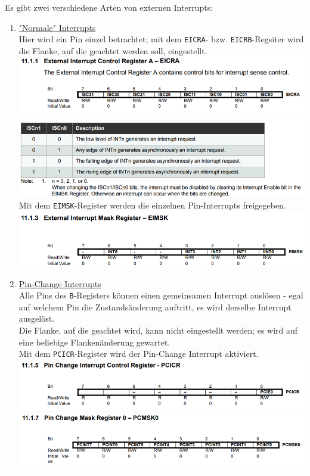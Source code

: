Es gibt zwei verschiedene Arten von externen Interrupts:
\begin{enumerate}
    \item \underline{"Normale" Interrupts} \\
    Hier wird ein Pin einzel betrachtet; mit dem \verb|EICRA|- bzw. \verb|EICRB|-Regsiter wird die Flanke, auf die geachtet werden soll, eingestellt. \\
    \includegraphics{Atmega/EICRA-Reg.png}
    \vspace{0.5cm}
    \includegraphics{Atmega/EICRA-Description.png}
    Mit dem \verb|EIMSK|-Register werden die einzelnen Pin-Interrupts freigegeben. \\
    \includegraphics{Atmega/EIMSK-Table.png}

    \item \underline{Pin-Change Interrupts} \\
    Alle Pins des \verb$B$-Registers können einen gemeinsamen Interrupt auslösen - egal auf welchem Pin die Zustandsänderung auftritt, es wird derselbe Interrupt ausgelöst. \\
    Die Flanke, auf die geachtet wird, kann nicht eingestellt werden; es wird auf eine beliebige Flankenänderung gewartet.\\

    Mit dem \verb|PCICR|-Register wird der Pin-Change Interrupt aktiviert. \\
    \includegraphics{Atmega/PCICR-Reg.png}
    \vspace{0.5cm}
    \includegraphics{Atmega/PCMSK0-Reg.png}
\end{enumerate}